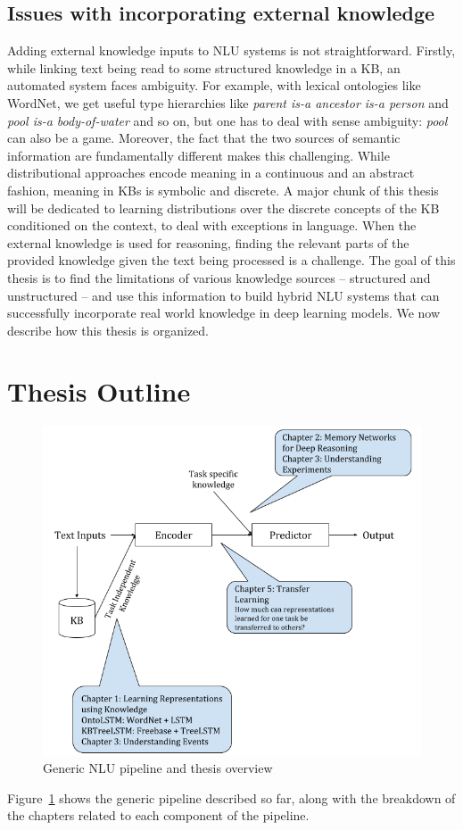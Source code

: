 \subsection{Issues with incorporating external knowledge}
Adding external knowledge inputs to NLU systems is not straightforward.  Firstly, while linking text being read to some structured knowledge
in a KB, an automated system faces ambiguity. For example, with lexical ontologies like WordNet, 
we get useful type hierarchies like \textit{parent is-a ancestor is-a person} and \textit{pool is-a body-of-water} 
and so on, but one has to deal with sense ambiguity: \textit{pool} can also be a game. Moreover, the fact that the two sources of semantic information are fundamentally different 
makes this challenging. While distributional approaches encode meaning in a
continuous and an abstract fashion, meaning in KBs is symbolic and discrete. A major chunk of this thesis will be dedicated to learning 
distributions over the discrete concepts of the KB conditioned on the context, to deal with exceptions in language.
When the external knowledge is used for reasoning, finding the 
relevant parts of the provided knowledge given the text being processed is a challenge. 
The goal of this thesis is to find the limitations of various knowledge sources -- structured and unstructured -- and use this information 
to build hybrid NLU systems that can successfully incorporate real world knowledge in deep learning models. We now describe how this thesis is organized.

\section{Thesis Outline}
\begin{figure}
\begin{center}
\includegraphics[width=6in]{figures/thesis_overview.png}
\caption{Generic NLU pipeline and thesis overview}
\label{fig:thesis_overview}
\end{center}
\end{figure}
Figure~\ref{fig:thesis_overview} shows the generic pipeline described so far, along with the breakdown of the chapters related to each component
of the pipeline.

